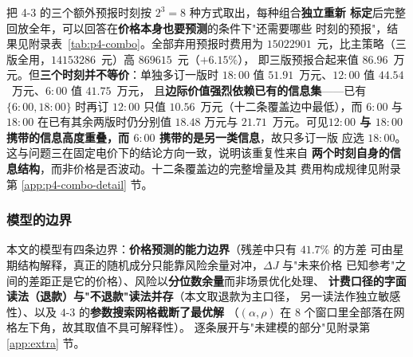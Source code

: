 把 4-3 的三个额外预报时刻按 $2^3=8$ 种方式取出，每种组合\textbf{独立重新
标定}后完整回放全年，可以回答在\textbf{价格本身也要预测}的条件下"还需要哪些
时刻的预报"，结果见附录表~\ref{tab:p4-combo}。全部弃用预报时费用为
$15022901$~元，比主策略（三版全用，$14153286$~元）高 $869615$~元（$+6.15\%$），
即三版预报合起来值 $86.96$~万元。但\textbf{三个时刻并不等价}：单独多订一版时
$18{:}00$ 值 $51.91$~万元、$12{:}00$ 值 $44.54$~万元、$6{:}00$ 值 $41.75$~万元，
且\textbf{边际价值强烈依赖已有的信息集}——已有 $\{6{:}00,18{:}00\}$ 时再订
$12{:}00$ 只值 $10.56$~万元（十二条覆盖边中最低），而 $6{:}00$ 与 $18{:}00$
在已有其余两版时仍分别值 $18.48$ 万元与 $21.71$~万元。可见\textbf{$12{:}00$
与 $18{:}00$ 携带的信息高度重叠，而 $6{:}00$ 携带的是另一类信息}，故只多订一版
应选 $18{:}00$。这与问题三在固定电价下的结论方向一致，说明该重复性来自
\textbf{两个时刻自身的信息结构}，而非价格是否波动。十二条覆盖边的完整增量及其
费用构成规律见附录第 \ref{app:p4-combo-detail} 节。

\subsubsection{模型的边界}
\label{sec:p4-limit}

本文的模型有四条边界：\textbf{价格预测的能力边界}（残差中只有 $41.7\%$ 的方差
可由星期结构解释，真正的随机成分只能靠风险余量对冲，$\Delta J$ 与"未来价格
已知参考"之间的差距正是它的价格）、风险以\textbf{分位数余量}而非场景优化处理、
\textbf{计费口径的字面读法（退款）与"不退款"读法并存}（本文取退款为主口径，
另一读法作独立敏感性）、以及 $4$-$3$ 的\textbf{参数搜索网格截断了最优解}
（$(\alpha,\rho)$ 在 $8$ 个窗口里全部落在网格左下角，故其取值不具可解释性）。
逐条展开与"未建模的部分"见附录第 \ref{app:extra} 节。

